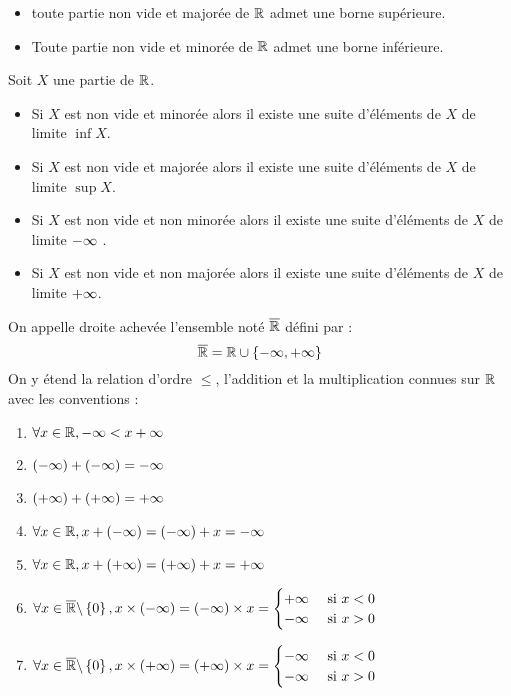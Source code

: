 \begin{prop}
    \begin{itemize}
        \item toute partie non vide et majorée de \(\mathbb{R}\) admet une borne supérieure.
        \item Toute partie non vide et minorée de \(\mathbb{R}\) admet une borne inférieure.
    \end{itemize}
\end{prop}

\begin{defprop}
Soit \(X\) une partie de \(\mathbb{R}\).
    \begin{itemize}
        \item Si \(X\) est non vide et minorée alors il existe une suite d’éléments de \(X\)  de limite \(\inf X\).
        \item Si \(X\) est non vide et majorée alors il existe une suite d’éléments de \(X\)  de limite \(\sup X\).
        \item Si \(X\) est non vide et non minorée alors il existe une suite d’éléments de \(X\)  de limite \(-\infty\) .
        \item Si \(X\) est non vide et non majorée alors il existe une suite d’éléments de \(X\)  de limite \(+\infty\).
    \end{itemize}
\end{defprop}

\begin{defprop}
    On appelle droite achevée l'ensemble noté \(\overline{\mathbb{R}}\) défini par :
    \[\overline{\mathbb{R}} = \mathbb{R} \cup \left\lbrace-\infty,+\infty\right\rbrace\]
    On y étend la relation d’ordre \(\leq\), l’addition et la multiplication connues sur \(\mathbb{R}\) avec les conventions :
    \begin{enumerate}
        \item \(\forall x\in \mathbb{R},-\infty < x+\infty\)
        \item \((-\infty)+(-\infty) = -\infty\)
        \item \((+\infty)+(+\infty) = +\infty\)
        \item \(\forall x \in \mathbb{R},x+(-\infty) = (-\infty)+x = -\infty\)
        \item \(\forall x \in \mathbb{R},x+(+\infty) = (+\infty)+x = +\infty\)
        \item \(\forall x \in \overline{\mathbb{R}} \backslash \left\lbrace0\right\rbrace, x \times (-\infty) = (-\infty)\times x = \begin{cases}
            +\infty & \text{ si } x<0 \\
            -\infty & \text{ si } x>0
        \end{cases}\)
        \item \(\forall x \in \overline{\mathbb{R}} \backslash \left\lbrace0\right\rbrace, x \times (+\infty) = (+\infty)\times x = \begin{cases}
            -\infty & \text{ si } x<0 \\
            -\infty & \text{ si } x>0
        \end{cases}\)
    \end{enumerate}
\end{defprop}

